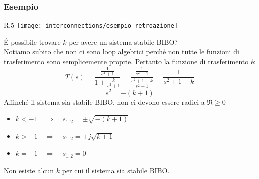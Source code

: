 \documentclass[../main.tex]{subfiles}
\begin{document}
	\subsubsection*{Esempio}
	\begin{wrapfigure}{R}{.5\linewidth}%
		\centering
		\texttt{[image: interconnections/esempio\_retroazione]}%
	\end{wrapfigure}
	\leavevmode%
	\'E possibile trovare $ k $ per avere un sistema stabile BIBO?\\
	Notiamo subito che non ci sono loop algebrici perch\'e non tutte le funzioni di trasferimento sono semplicemente proprie. Pertanto la funzione di trasferimento \'e:
	\[ T(s) = \frac{\frac{1}{s^2+1}}{1+\frac{k}{s^2+1}} = \frac{\frac{1}{s^2+1}}{\frac{s^2+1+k}{s^2+1}} = \frac{1}{s^2+1+k} \]
	\[ s^2 = -(k+1) \]
	Affinch\'e il sistema sia stabile BIBO, non ci devono essere radici a $ \Re \geq 0 $
	\begin{itemize}
		\item $ k<-1 \quad \Rightarrow \quad s_{1,2} = \pm \sqrt{-(k+1)} $
		\item $ k>-1 \quad \Rightarrow \quad s_{1,2} = \pm j \sqrt{k+1} $
		\item $ k=-1 \quad \Rightarrow \quad s_{1,2} = 0 $
	\end{itemize}
	Non esiste alcun $ k $ per cui il sistema sia stabile BIBO.
	\pagebreak
	
\end{document}
